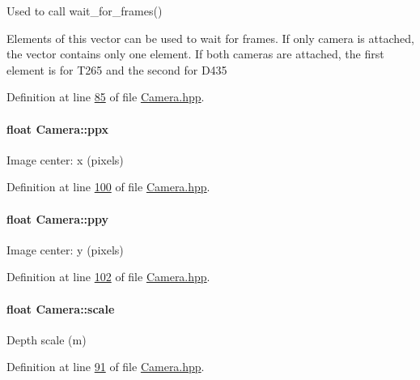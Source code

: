 Used to call wait\+\_\+for\+\_\+frames() 

Elements of this vector can be used to wait for frames. If only camera is attached, the vector contains only one element. If both cameras are attached, the first element is for T265 and the second for D435 

Definition at line \hyperlink{Camera_8hpp_source_l00085}{85} of file \hyperlink{Camera_8hpp_source}{Camera.\+hpp}.

\paragraph[{\texorpdfstring{ppx}{ppx}}]{\setlength{\rightskip}{0pt plus 5cm}float Camera\+::ppx}\hypertarget{classCamera_aa646a2de04e9ad37395dcf3c4a171abe}{}\label{classCamera_aa646a2de04e9ad37395dcf3c4a171abe}


Image center\+: x (pixels) 



Definition at line \hyperlink{Camera_8hpp_source_l00100}{100} of file \hyperlink{Camera_8hpp_source}{Camera.\+hpp}.

\paragraph[{\texorpdfstring{ppy}{ppy}}]{\setlength{\rightskip}{0pt plus 5cm}float Camera\+::ppy}\hypertarget{classCamera_a0e51f157264b9c9e18feb584c5a6c606}{}\label{classCamera_a0e51f157264b9c9e18feb584c5a6c606}


Image center\+: y (pixels) 



Definition at line \hyperlink{Camera_8hpp_source_l00102}{102} of file \hyperlink{Camera_8hpp_source}{Camera.\+hpp}.

\paragraph[{\texorpdfstring{scale}{scale}}]{\setlength{\rightskip}{0pt plus 5cm}float Camera\+::scale}\hypertarget{classCamera_a50152f7c8f2ce7601dd6086c90b3a65c}{}\label{classCamera_a50152f7c8f2ce7601dd6086c90b3a65c}


Depth scale (m) 



Definition at line \hyperlink{Camera_8hpp_source_l00091}{91} of file \hyperlink{Camera_8hpp_source}{Camera.\+hpp}.

